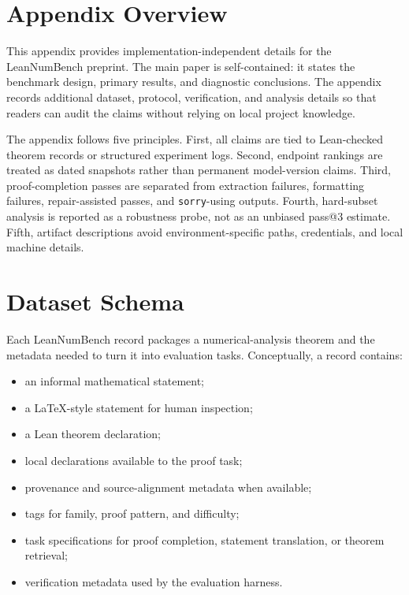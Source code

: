 \section{Appendix Overview}

This appendix provides implementation-independent details for the LeanNumBench
preprint. The main paper is self-contained: it states the benchmark design,
primary results, and diagnostic conclusions. The appendix records additional
dataset, protocol, verification, and analysis details so that readers can audit
the claims without relying on local project knowledge.

The appendix follows five principles. First, all claims are tied to
Lean-checked theorem records or structured experiment logs. Second, endpoint
rankings are treated as dated snapshots rather than permanent model-version
claims. Third, proof-completion passes are separated from extraction failures,
formatting failures, repair-assisted passes, and \texttt{sorry}-using outputs.
Fourth, hard-subset analysis is reported as a robustness probe, not as an
unbiased pass@3 estimate. Fifth, artifact descriptions avoid
environment-specific paths, credentials, and local machine details.

\section{Dataset Schema}

Each LeanNumBench record packages a numerical-analysis theorem and the metadata
needed to turn it into evaluation tasks. Conceptually, a record contains:

\begin{itemize}
\item an informal mathematical statement;
\item a LaTeX-style statement for human inspection;
\item a Lean theorem declaration;
\item local declarations available to the proof task;
\item provenance and source-alignment metadata when available;
\item tags for family, proof pattern, and difficulty;
\item task specifications for proof completion, statement translation, or
theorem retrieval;
\item verification metadata used by the evaluation harness.
\end{itemize}

